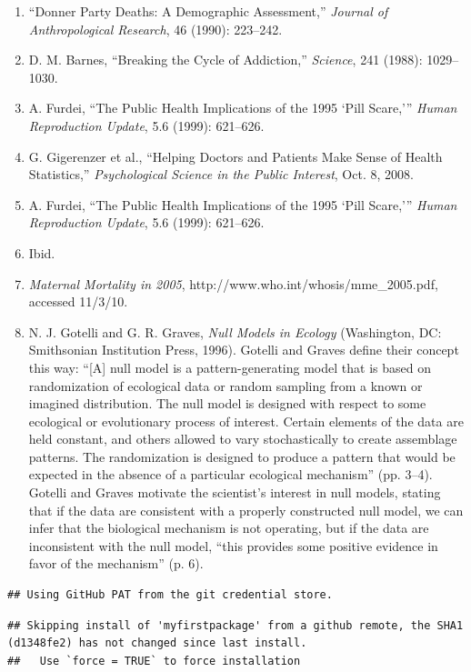\documentclass[
]{book}
\begin{document}
\begin{enumerate}
\item “Donner Party Deaths: A Demographic Assessment,” \textit{Journal of Anthropological Research}, 46 (1990): 223–242.
\item D. M. Barnes, “Breaking the Cycle of Addiction,” \textit{Science}, 241 (1988): 1029–1030.
\item A. Furdei, “The Public Health Implications of the 1995 ‘Pill Scare,’” \textit{Human Reproduction Update}, 5.6 (1999): 621–626.
\item G. Gigerenzer et al., “Helping Doctors and Patients Make Sense of Health Statistics,” \textit{Psychological Science in the
Public Interest}, Oct. 8, 2008.
\item A. Furdei, “The Public Health Implications of the 1995 ‘Pill Scare,’” \textit{Human Reproduction Update}, 5.6 (1999):
621–626.
\item Ibid.
\item \textit{Maternal Mortality in 2005}, http://www.who.int/whosis/mme\_2005.pdf, accessed 11/3/10.
\item N. J. Gotelli and G. R. Graves, \textit{Null Models in Ecology} (Washington, DC: Smithsonian Institution Press, 1996).
Gotelli and Graves define their concept this way: “[A] null model is a pattern-generating model that is based on
randomization of ecological data or random sampling from a known or imagined distribution. The null model is
designed with respect to some ecological or evolutionary process of interest. Certain elements of the data are held
constant, and others allowed to vary stochastically to create assemblage patterns. The randomization is designed to
produce a pattern that would be expected in the absence of a particular ecological mechanism” (pp. 3–4). Gotelli
and Graves motivate the scientist’s interest in null models, stating that if the data are consistent with a properly
constructed null model, we can infer that the biological mechanism is not operating, but if the data are inconsistent
with the null model, “this provides some positive evidence in favor of the mechanism” (p. 6).

\end{enumerate}

\begin{verbatim}
## Using GitHub PAT from the git credential store.
\end{verbatim}

\begin{verbatim}
## Skipping install of 'myfirstpackage' from a github remote, the SHA1 (d1348fe2) has not changed since last install.
##   Use `force = TRUE` to force installation
\end{verbatim}
\end{document}
